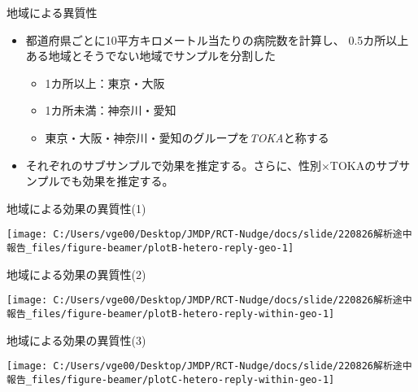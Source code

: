 \documentclass[
      aspectratio=169,
        12pt,
    ]{beamer}
\providecommand{\tightlist}{%
  \setlength{\itemsep}{0pt}\setlength{\parskip}{0pt}}
\begin{document}
\begin{frame}{地域による異質性}
\protect\hypertarget{ux5730ux57dfux306bux3088ux308bux7570ux8ceaux6027}{}
\begin{itemize}
\tightlist
\item
  都道府県ごとに10平方キロメートル当たりの病院数を計算し、
  0.5カ所以上ある地域とそうでない地域でサンプルを分割した

  \begin{itemize}
  \tightlist
  \item
    1カ所以上：東京・大阪
  \item
    1カ所未満：神奈川・愛知
  \item
    東京・大阪・神奈川・愛知のグループを\emph{TOKA}と称する
  \end{itemize}
\item
  それぞれのサブサンプルで効果を推定する。さらに、性別×TOKAのサブサンプルでも効果を推定する。
\end{itemize}
\end{frame}

\begin{frame}{地域による効果の異質性(1)}
\protect\hypertarget{ux5730ux57dfux306bux3088ux308bux52b9ux679cux306eux7570ux8ceaux60271}{}
\begin{center}\texttt{[image: C:/Users/vge00/Desktop/JMDP/RCT-Nudge/docs/slide/220826解析途中報告\_files/figure-beamer/plotB-hetero-reply-geo-1]} \end{center}
\end{frame}

\begin{frame}{地域による効果の異質性(2)}
\protect\hypertarget{ux5730ux57dfux306bux3088ux308bux52b9ux679cux306eux7570ux8ceaux60272}{}
\begin{center}\texttt{[image: C:/Users/vge00/Desktop/JMDP/RCT-Nudge/docs/slide/220826解析途中報告\_files/figure-beamer/plotB-hetero-reply-within-geo-1]} \end{center}
\end{frame}

\begin{frame}{地域による効果の異質性(3)}
\protect\hypertarget{ux5730ux57dfux306bux3088ux308bux52b9ux679cux306eux7570ux8ceaux60273}{}
\begin{center}\texttt{[image: C:/Users/vge00/Desktop/JMDP/RCT-Nudge/docs/slide/220826解析途中報告\_files/figure-beamer/plotC-hetero-reply-within-geo-1]} \end{center}
\end{frame}
\end{document}
